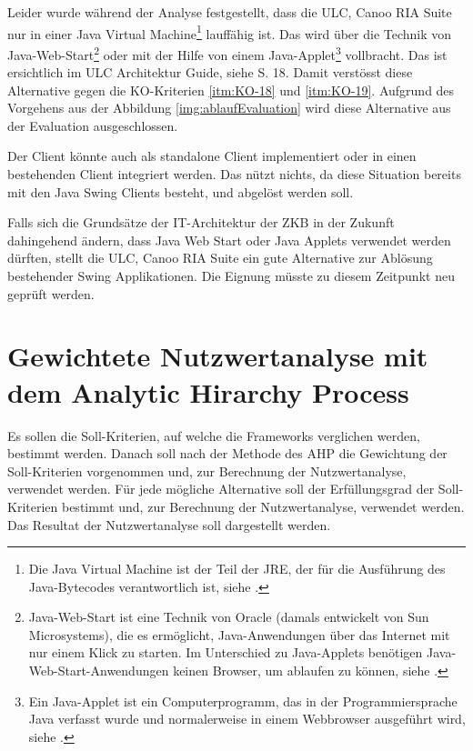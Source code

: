   Leider wurde während der Analyse festgestellt, dass die ULC, Canoo RIA Suite
  nur in einer Java Virtual Machine\footnote{Die Java Virtual Machine ist der
  Teil der \ac{JRE}, der für die Ausführung des Java-Bytecodes verantwortlich
  ist, siehe \cite{JavaVirtualMachine}.} lauffähig ist. Das wird über die
  Technik von Java-Web-Start\footnote{Java-Web-Start ist eine Technik von
  Oracle (damals entwickelt von Sun Microsystems), die es ermöglicht, Java-Anwendungen
  über das Internet mit nur einem Klick zu starten. Im Unterschied zu
  Java-Applets benötigen Java-Web-Start-Anwendungen keinen Browser, um ablaufen
  zu können, siehe \cite{JavaWebStart}.} oder mit der Hilfe von einem
  Java-Applet\footnote{Ein Java-Applet ist ein Computerprogramm, das in der
  Programmiersprache Java verfasst wurde und normalerweise in einem Webbrowser
  ausgeführt wird, siehe \cite{JavaApplet}.} vollbracht. Das ist ersichtlich im
  ULC Architektur Guide, siehe \cite{ULCArchitectureGuide} S. 18. Damit
  verstösst diese Alternative gegen die KO-Kriterien \ref{itm:KO-18} und
  \ref{itm:KO-19}. Aufgrund des Vorgehens aus der Abbildung
  \ref{img:ablaufEvaluation} wird diese Alternative aus der Evaluation
  ausgeschlossen.
  
  Der Client könnte auch als standalone Client implementiert oder in einen
  bestehenden Client integriert werden. Das nützt nichts, da diese Situation
  bereits mit den Java Swing Clients besteht, und abgelöst werden soll.
  
  Falls sich die Grundsätze der IT-Architektur der \ac{ZKB} in der Zukunft
  dahingehend ändern, dass Java Web Start oder Java Applets verwendet werden
  dürften, stellt die ULC, Canoo RIA Suite ein gute Alternative zur Ablösung
  bestehender Swing Applikationen. Die Eignung müsste zu diesem Zeitpunkt neu
  geprüft werden.
    
  \section{Gewichtete Nutzwertanalyse mit dem Analytic Hirarchy Process}
  
  Es sollen die Soll-Kriterien, auf welche die Frameworks verglichen werden,
  bestimmt werden. Danach soll nach der Methode des \ac{AHP} die Gewichtung der
  Soll-Kriterien vorgenommen und, zur Berechnung der Nutzwertanalyse,
  verwendet werden. Für jede mögliche Alternative soll der Erfüllungsgrad der
  Soll-Kriterien bestimmt und, zur Berechnung der Nutzwertanalyse, verwendet
  werden. Das Resultat der Nutzwertanalyse soll dargestellt werden.
  
